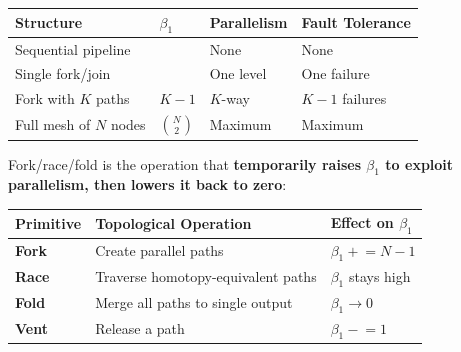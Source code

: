 \documentclass[
  11pt,
]{article}
\newcounter{none} %
\begin{document}
{\def\LTcaptype{none} %
\begin{longtable}[]{@{}
  >{\raggedright\arraybackslash}p{}
  >{\raggedright\arraybackslash}p{}
  >{\raggedright\arraybackslash}p{}
  >{\raggedright\arraybackslash}p{}@{}}
\toprule\noalign{}
\begin{minipage}[b]{\linewidth}\raggedright
Structure
\end{minipage} & \begin{minipage}[b]{\linewidth}\raggedright
\(\beta_1\)
\end{minipage} & \begin{minipage}[b]{\linewidth}\raggedright
Parallelism
\end{minipage} & \begin{minipage}[b]{\linewidth}\raggedright
Fault Tolerance
\end{minipage} \\
\midrule\noalign{}
\endhead
\bottomrule\noalign{}
\endlastfoot
Sequential pipeline & 0 & None & None \\
Single fork/join & 1 & One level & One failure \\
Fork with \(K\) paths & \(K-1\) & \(K\)-way & \(K-1\) failures \\
Full mesh of \(N\) nodes & \(\binom{N}{2}\) & Maximum & Maximum \\
\end{longtable}
}

Fork/race/fold is the operation that \textbf{temporarily raises
\(\beta_1\) to exploit parallelism, then lowers it back to zero}:

{\def\LTcaptype{none} %
\begin{longtable}[]{@{}
  >{\raggedright\arraybackslash}p{}
  >{\raggedright\arraybackslash}p{}
  >{\raggedright\arraybackslash}p{}@{}}
\toprule\noalign{}
\begin{minipage}[b]{\linewidth}\raggedright
Primitive
\end{minipage} & \begin{minipage}[b]{\linewidth}\raggedright
Topological Operation
\end{minipage} & \begin{minipage}[b]{\linewidth}\raggedright
Effect on \(\beta_1\)
\end{minipage} \\
\midrule\noalign{}
\endhead
\bottomrule\noalign{}
\endlastfoot
\textbf{Fork} & Create parallel paths & \(\beta_1 \mathrel{+}= N-1\) \\
\textbf{Race} & Traverse homotopy-equivalent paths & \(\beta_1\) stays
high \\
\textbf{Fold} & Merge all paths to single output & \(\beta_1 \to 0\) \\
\textbf{Vent} & Release a path & \(\beta_1 \mathrel{-}= 1\) \\
\end{longtable}
}
\end{document}
